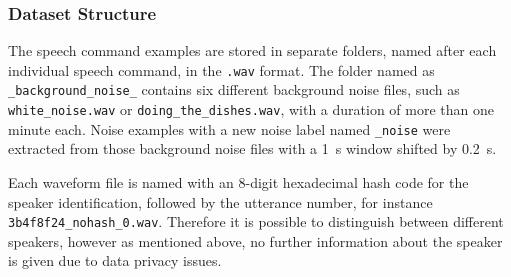 \subsubsection{Dataset Structure}
The speech command examples are stored in separate folders, named after each individual speech command, in the \texttt{.wav} format.
The folder named as \texttt{\_background\_noise\_} contains six different background noise files, such as \texttt{white\_noise.wav} or \texttt{doing\_the\_dishes.wav}, with a duration of more than one minute each.
Noise examples with a new noise label named \texttt{\_noise} were extracted from those background noise files with a \SI{1}{\second} window shifted by \SI{0.2}{\second}.

Each waveform file is named with an 8-digit hexadecimal hash code for the speaker identification, followed by the utterance number, for instance \texttt{3b4f8f24\_nohash\_0.wav}.
Therefore it is possible to distinguish between different speakers, however as mentioned above, no further information about the speaker is given due to data privacy issues.




